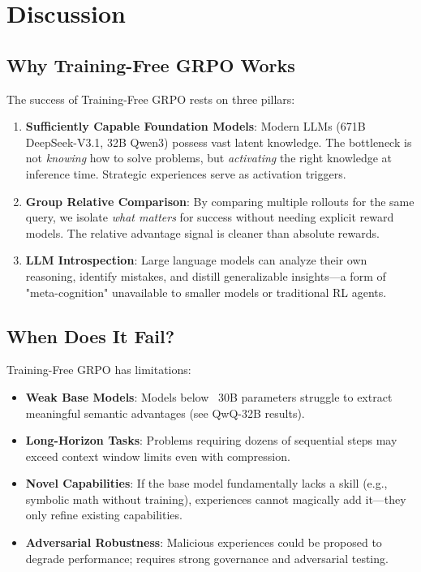 \section{Discussion}


\subsection{Why Training-Free GRPO Works}

The success of Training-Free GRPO rests on three pillars:

\begin{enumerate}
    \item \textbf{Sufficiently Capable Foundation Models}: Modern LLMs (671B DeepSeek-V3.1, 32B Qwen3) possess vast latent knowledge. The bottleneck is not \textit{knowing} how to solve problems, but \textit{activating} the right knowledge at inference time. Strategic experiences serve as activation triggers.

    \item \textbf{Group Relative Comparison}: By comparing multiple rollouts for the same query, we isolate \textit{what matters} for success without needing explicit reward models. The relative advantage signal is cleaner than absolute rewards.

    \item \textbf{LLM Introspection}: Large language models can analyze their own reasoning, identify mistakes, and distill generalizable insights—a form of "meta-cognition" unavailable to smaller models or traditional RL agents.
\end{enumerate}

\subsection{When Does It Fail?}

Training-Free GRPO has limitations:

\begin{itemize}
    \item \textbf{Weak Base Models}: Models below ~30B parameters struggle to extract meaningful semantic advantages (see QwQ-32B results).

    \item \textbf{Long-Horizon Tasks}: Problems requiring dozens of sequential steps may exceed context window limits even with compression.

    \item \textbf{Novel Capabilities}: If the base model fundamentally lacks a skill (e.g., symbolic math without training), experiences cannot magically add it—they only refine existing capabilities.

    \item \textbf{Adversarial Robustness}: Malicious experiences could be proposed to degrade performance; requires strong governance and adversarial testing.
\end{itemize}

